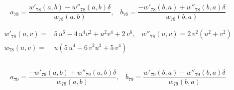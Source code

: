 \subsection{}
          
\begin{equation*}
a_{78}= \frac{w'_{78}(a,b) -w''_{78}(a,b) \delta }{w_{78}(a,b) },\;\;\;
b_{78}=  \frac{-w'_{78}(b,a)+w''_{78}(b,a) \delta}{w_{78}(b,a)} 
\end{equation*}

\begin{align*}
w'_{78}(u,v)=&5\,{u}^{6}-4\,{u}^{4}{v}^{2}+{u}^{2}{v}^{4}+2\,{v}^{6},\;\;\;w''_{78}(u,v)= 2\,{v}^{2} \left( {u}^{2}+{v}^{2}\right)\\
w_{78}(u,v)=&u \left( 5\,{u}^{4}-6\,{v}^{2}{u}^{2}+5\,{v}^{4} \right)\
\end{align*}

\subsection{}


\begin{equation*}
a_{79}= \frac{-w'_{79}(a,b) + w''_{79}(a,b) \delta  }{w_{79}(a,b) }, \;\;\; 
b_{79}= \frac{  w'_{79}(b,a)- w''_{79}(b,a) \delta  }{  w_{79}(b,a)  }\end{equation*}

